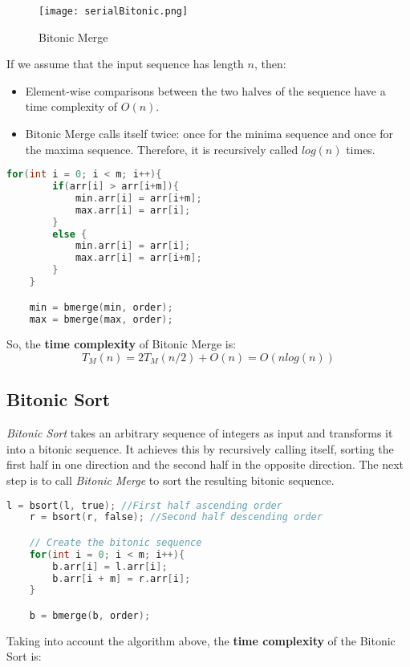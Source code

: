 \documentclass[12pt]{article}
\begin{document}
\begin{figure}[H]
    \centering
    \texttt{[image: serialBitonic.png]}
    \caption{Bitonic Merge}
    \label{fig:enter-label}
\end{figure}

If we assume that the input sequence has length $n$, then:

\begin{itemize} 
\item Element-wise comparisons between the two halves of the sequence have a time complexity of $O(n)$.
\item Bitonic Merge calls itself twice: once for the minima sequence and once for the maxima sequence. Therefore, it is recursively called $log(n)$ times. 
\end{itemize}

\begin{lstlisting}[language=C]
    for(int i = 0; i < m; i++){
        if(arr[i] > arr[i+m]){
            min.arr[i] = arr[i+m];
            max.arr[i] = arr[i];
        } 
        else {
            min.arr[i] = arr[i];
            max.arr[i] = arr[i+m];
        }
    }

    min = bmerge(min, order);
    max = bmerge(max, order);
\end{lstlisting}
\vspace{0.3cm}
So, the \textbf{time complexity} of Bitonic Merge is:
\[T_M(n) = 2T_M(n/2) + O(n) = O(nlog(n))\]

\subsection{Bitonic Sort}
\textit{Bitonic Sort} takes an arbitrary sequence of integers as input and transforms it into a bitonic sequence. It achieves this by recursively calling itself, sorting the first half in one direction and the second half in the opposite direction. The next step is to call \textit{Bitonic Merge} to sort the resulting bitonic sequence.
\vspace{0.3cm}
\begin{lstlisting}[language=C]
    l = bsort(l, true); //First half ascending order
    r = bsort(r, false); //Second half descending order

    // Create the bitonic sequence
    for(int i = 0; i < m; i++){
        b.arr[i] = l.arr[i];
        b.arr[i + m] = r.arr[i];
    }

    b = bmerge(b, order);
\end{lstlisting}
\vspace{0.3cm}
Taking into account the algorithm above, the \textbf{time complexity} of the Bitonic Sort is:
\end{document}
